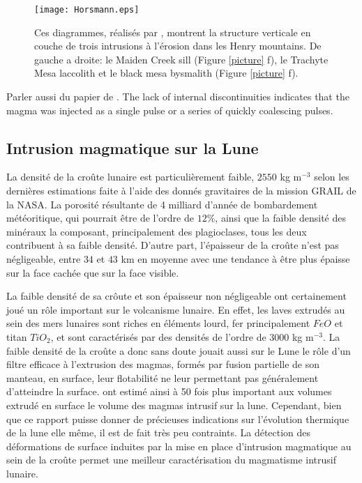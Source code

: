 \begin{figure}[h!]
  \begin{center}
    \graphicspath{ {/Users/thorey/Documents/These/Manuscript/Figure/Chapter1/} }
    \texttt{[image: Horsmann.eps]}
    \caption{Ces  diagrammes,  réalisés  par  \citet{Horsman:2009gea},
      montrent la structure verticale en  couche de trois intrusions à
      l'érosion  dans les  Henry  mountains. De  gauche  a droite:  le
      Maiden  Creek sill  (Figure \ref{picture}  f), le  Trachyte Mesa
      laccolith et le black mesa bysmalith (Figure \ref{picture} f).}
    \label{Horsmann}
  \end{center}
\end{figure}

Parler aussi du papier de \citep{Roni:2014gt}. The lack of internal discontinuities indicates that the magma was injected as a single pulse or a series of quickly coalescing pulses.
\subsection{Intrusion magmatique sur la Lune}
\label{sec:moon}

La densité de la croûte lunaire est particulièrement faible, $2550$ kg
m$^{-3}$ selon  les dernières  estimations faite  à l'aide  des donnés
gravitaires de  la mission GRAIL de  la NASA\citep{Wieczorek:2013ipa}.
La  porosité   résultante  de  4  milliard   d'année  de  bombardement
météoritique, qui  pourrait être  de l'ordre de  $12\%$, ainsi  que la
faible  densité   des  minéraux   la  composant,   principalement  des
plagioclases, tous les  deux contribuent à sa  faible densité. D'autre
part, l'épaisseur  de la croûte  n'est pas négligeable, entre  $34$ et
$43$ km en moyenne  avec une tendance à être plus  épaisse sur la face
cachée que sur la face visible.

La faible  densité de sa crôute  et son épaisseur non  négligeable ont
certainement joué  un rôle  important sur  le volcanisme  lunaire.  En
effet, les  laves extrudés au  sein des  mers lunaires sont  riches en
éléments lourd,  fer principalement  $FeO$ et  titan $TiO_2$,  et sont
caractérisés par  des densités  de l'ordre de  $3000$ kg  m$^{-3}$. La
faible densité de la croûte a donc sans doute jouait aussi sur le Lune
le  rôle d'un  filtre efficace  à l'extrusion  des magmas,  formés par
fusion partielle de son manteau,  en surface, leur flotabilité ne leur
permettant        pas        généralement        d'atteindre        la
surface. \citet{Head:1992bk} ont estimé ainsi à 50 fois plus important
aux volumes  extrudé en surface le  volume des magmas intrusif  sur la
lune.   Cependant, bien  que ce  rapport puisse  donner de  précieuses
indications sur l'évolution thermique de la  lune elle même, il est de
fait très  peu contraints.  La  détection des déformations  de surface
induites par  la mise en  place d'intrusion  magmatique au sein  de la
croûte  permet une  meilleur  caractérisation  du magmatisme  intrusif
lunaire.

